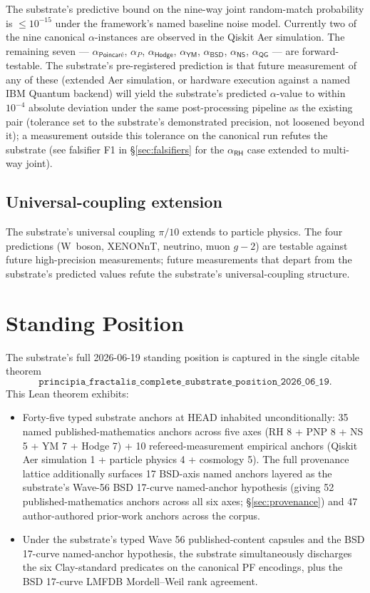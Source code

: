 \documentclass[11pt,a4paper]{amsart}
\theoremstyle{plain}
\theoremstyle{definition}
\begin{document}
The substrate's predictive bound on the nine-way joint random-match probability is $\le 10^{-15}$ under the framework's named baseline noise model. Currently two of the nine canonical $\alpha$-instances are observed in the Qiskit Aer simulation. The remaining seven --- $\alpha_{\textsf{Poincar\'e}}$, $\alpha_{P}$, $\alpha_{\textsf{Hodge}}$, $\alpha_{\textsf{YM}}$, $\alpha_{\textsf{BSD}}$, $\alpha_{\textsf{NS}}$, $\alpha_{\textsf{QG}}$ --- are forward-testable. The substrate's pre-registered prediction is that future measurement of any of these (extended Aer simulation, or hardware execution against a named IBM Quantum backend) will yield the substrate's predicted $\alpha$-value to within $10^{-4}$ absolute deviation under the same post-processing pipeline as the existing pair (tolerance set to the substrate's demonstrated precision, not loosened beyond it); a measurement outside this tolerance on the canonical run refutes the substrate (see falsifier F1 in \S\ref{sec:falsifiers} for the $\alpha_{\textsf{RH}}$ case extended to multi-way joint).

\subsection{Universal-coupling extension}

The substrate's universal coupling $\pi/10$ extends to particle physics. The four predictions (W~boson, XENONnT, neutrino, muon $g-2$) are testable against future high-precision measurements; future measurements that depart from the substrate's predicted values refute the substrate's universal-coupling structure.

\section{Standing Position}\label{sec:standing-position}

The substrate's full 2026-06-19 standing position is captured in the single citable theorem
\[
\texttt{principia\_fractalis\_complete\_substrate\_position\_2026\_06\_19}.
\]
This Lean theorem exhibits:
\begin{itemize}[itemsep=2pt]
\item Forty-five typed substrate anchors at HEAD inhabited unconditionally:
35 named published-mathematics anchors across five axes (RH 8 + PNP 8 + NS 5 + YM 7 + Hodge 7) + 10 refereed-measurement empirical anchors (Qiskit Aer simulation 1 + particle physics 4 + cosmology 5). The full provenance lattice additionally surfaces 17 BSD-axis named anchors layered as the substrate's Wave-56 BSD 17-curve named-anchor hypothesis (giving 52 published-mathematics anchors across all six axes; \S\ref{sec:provenance}) and 47 author-authored prior-work anchors across the corpus.
\item Under the substrate's typed Wave 56 published-content capsules and the BSD 17-curve named-anchor hypothesis, the substrate simultaneously discharges the six Clay-standard predicates on the canonical PF encodings, plus the BSD 17-curve LMFDB Mordell--Weil rank agreement.
\end{itemize}
\end{document}
